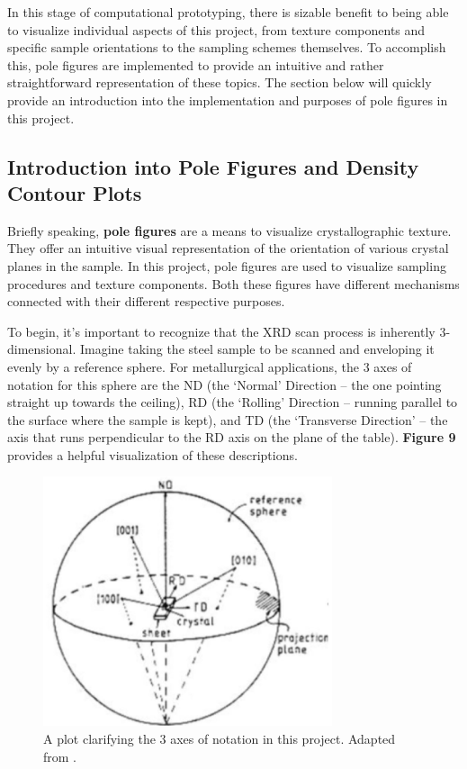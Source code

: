 \documentclass[10pt]{article}
\begin{document}
In this stage of computational prototyping, there is sizable benefit to being able to visualize individual aspects of this project, from texture components and
specific sample orientations to the sampling schemes themselves. To accomplish this, pole figures are implemented to provide an intuitive and rather 
straightforward representation of these topics. The section below will quickly provide an introduction into the implementation and purposes of pole 
figures in this project.

\subsection{Introduction into Pole Figures and Density Contour Plots}
Briefly speaking, \textbf{pole figures} are a means to visualize crystallographic texture. They offer an intuitive visual representation
of the orientation of various crystal planes in the sample. In this project, pole figures are used to visualize
sampling procedures and texture components. Both these figures have different mechanisms connected with their 
different respective purposes.

To begin, it's important to recognize that the XRD scan process is inherently 3-dimensional. Imagine taking the steel sample to be scanned
and enveloping it evenly by a reference sphere. For metallurgical applications, the 3 axes of notation for this sphere are the ND 
(the ‘Normal’ Direction – the one pointing straight up towards the ceiling), RD (the ‘Rolling’ 
Direction – running parallel to the surface where the sample is kept), and TD (the ‘Transverse 
Direction’ – the axis that runs perpendicular to the RD axis on the plane of the table). \textbf{Figure 9} provides a helpful visualization 
of these descriptions.
\begin{figure}[h]
    \centering
    \includegraphics[width=8.5cm]{fig9}
    \caption{\label{tab1}A plot clarifying the 3 axes of notation in this project. Adapted from \cite{ref09}. } 
    \end{figure}
\end{document}
